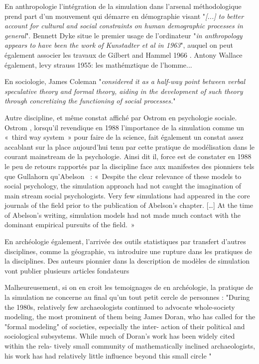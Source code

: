 {En anthropologie l'intégration de la simulation dans l'arsenal méthodologique prend part d'un mouvement qui démarre en démographie visant "\textit{[...] to better account for cultural and social constraints on human demographic processes in general}". Bennett Dyke situe le premier usage de l'ordinateur "\textit{in anthropology appears to have been the work of Kunstadter et al in 1963}", auquel on peut également associer les travaux de Gilbert and Hammel 1966 \autocite{Costopoulos2007} \autocite{Dyke1981}. Antony Wallace également, levy strauss 1955: les mathémztique de l'homme...
 
En sociologie, James Coleman "\textit{considered it as a half-way point between verbal speculative theory and formal theory, aiding in the development of such theory through concretizing the functioning of social processes.}" \autocite[36]{Schultz1972}


Autre discipline, et même constat affiché par Ostrom en psychologie sociale. Ostrom \autocite{Ostrom1988}, lorsqu'il revendique en 1988 l'importance de la simulation comme un « third way system » pour faire de la science,  fait également un constat assez accablant sur la place aujourd'hui tenu par cette pratique de modélisation dans le courant mainstream de la psychologie. Ainsi dit il,  force est de constater en 1988 le peu de retours rapportés par la discipline face aux manifestes des pionniers tels que Gullahorn \autocite{Gullahorn1965} qu'Abelson \autocite{Abelson1968} : « Despite the clear relevance of these models to  social psychology, the simulation approach had not caught the imagination of main stream social psychologists. Very few simulations had appeared in the core journals of the field prior to the publication of Abelson's chapter. […] At the time of Abelson's writing, simulation models had not made much contact with the dominant empirical pursuits of the field. » \autocite[382]{Ostrom1988}

En archéologie également, l'arrivée des outils statistiques par transfert d'autres disciplines, comme la géographie, va introduire une rupture dans les pratiques de la disciplines. Des auteurs pionnier dans la description de modèles de simulation vont publier plusieurs articles fondateurs \autocite{Clarke1968} \autocite{Doran1970} 

Malheureusement, si on en croit les temoignages de \autocite{Aldenderfer1998} en archéologie, la pratique de la simulation ne concerne au final qu'un tout petit cercle de personnes : "During the 1980s, relatively few archaeologists continued to advocate whole-society modeling, the most prominent of them being James Doran, who has called for the "formal modeling" of societies, especially the inter- action of their political and sociological subsystems. While much of Doran's work has been widely cited within the rela- tively small community of mathematically inclined archaeologists, his work has had relatively little influence beyond this small circle " \autocite{Aldenderfer1998}

}
